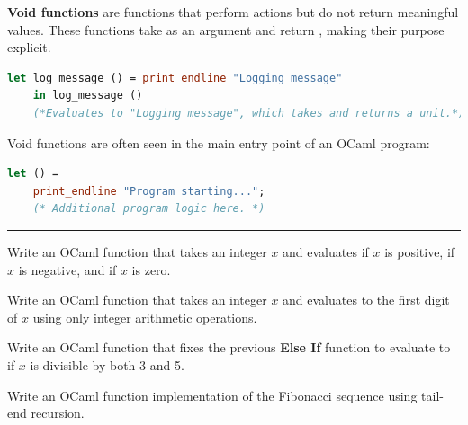 \begin{Def}

\label{def:void}
\textbf{Void functions} are functions that perform actions but do not return meaningful values. 
These functions take  as an argument and return , making their purpose explicit.

\begin{lstlisting}[language=OCaml, caption={Void Function Example}, numbers=none]
    let log_message () = print_endline "Logging message" 
    in log_message ()
    (*Evaluates to "Logging message", which takes and returns a unit.*)
\end{lstlisting}

\noindent
Void functions are often seen in the main entry point of an OCaml program:
\begin{lstlisting}[language=OCaml, caption={Using \snippet{let ()} in the Main Function}, numbers=none]
    let () =
    print_endline "Program starting...";
    (* Additional program logic here. *)
\end{lstlisting}
\end{Def}

\vspace{1em}
\noindent
\rule{\textwidth}{0.4pt}

\vspace{2em}

\begin{Exercise}
Write an OCaml function that takes an integer $x$ and evaluates  if $x$ is positive,  if $x$ is negative, and  if $x$ is zero.
\end{Exercise}
    
    
\vspace{1em}
\begin{Exercise}
Write an OCaml function that takes an integer $x$ and evaluates to the first digit of $x$ using only integer arithmetic operations.
\end{Exercise}

\vspace{1em}
\begin{Exercise}
Write an OCaml function that fixes the previous \textbf{Else If} function to evaluate to  if $x$ is divisible by both 3 and 5.
\end{Exercise}

\vspace{1em}
\begin{Exercise}
Write an OCaml function implementation of the Fibonacci sequence using tail-end recursion.
\end{Exercise}



